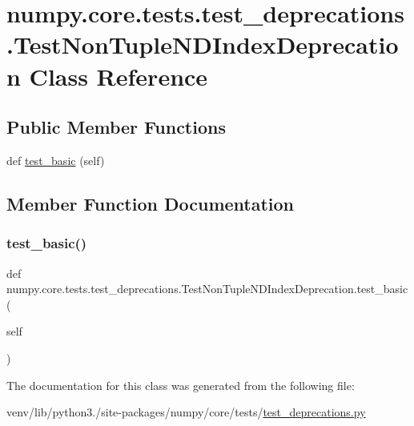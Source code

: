 \hypertarget{classnumpy_1_1core_1_1tests_1_1test__deprecations_1_1TestNonTupleNDIndexDeprecation}{}\section{numpy.\+core.\+tests.\+test\+\_\+deprecations.\+Test\+Non\+Tuple\+N\+D\+Index\+Deprecation Class Reference}
\label{classnumpy_1_1core_1_1tests_1_1test__deprecations_1_1TestNonTupleNDIndexDeprecation}
\subsection*{Public Member Functions}
\begin{DoxyCompactItemize}
\item 
def \hyperlink{classnumpy_1_1core_1_1tests_1_1test__deprecations_1_1TestNonTupleNDIndexDeprecation_ac3e00a7f08ea34231a5571990db5fc1e}{test\+\_\+basic} (self)
\end{DoxyCompactItemize}


\subsection{Member Function Documentation}
\mbox{\label{classnumpy_1_1core_1_1tests_1_1test__deprecations_1_1TestNonTupleNDIndexDeprecation_ac3e00a7f08ea34231a5571990db5fc1e}} 
\subsubsection{\texorpdfstring{test\+\_\+basic()}{test\_basic()}}
{\footnotesize\ttfamily def numpy.\+core.\+tests.\+test\+\_\+deprecations.\+Test\+Non\+Tuple\+N\+D\+Index\+Deprecation.\+test\+\_\+basic (\begin{DoxyParamCaption}\item[{}]{self }\end{DoxyParamCaption})}



The documentation for this class was generated from the following file\+:\begin{DoxyCompactItemize}
\item 
venv/lib/python3./site-\/packages/numpy/core/tests/\hyperlink{core_2tests_2test__deprecations_8py}{test\+\_\+deprecations.\+py}\end{DoxyCompactItemize}
